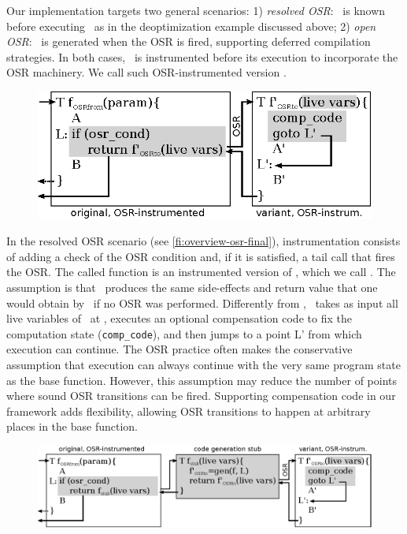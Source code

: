 Our implementation targets two general scenarios: 1) {\em resolved OSR}: \fvariant\ is known before executing \fbase\ as in the deoptimization example discussed above; 2) {\em open OSR}: \fvariant\ is generated when the OSR is fired, supporting deferred compilation strategies. In both cases, \fbase\ is instrumented before its execution to incorporate the OSR machinery. We call such OSR-instrumented version \fosrfrom.

\ifdefined\noauthorea
\begin{figure}[t]
\begin{center}
\includegraphics[width=0.7\columnwidth]{figures/overview-osr-final/overview-osr-final.eps}
\caption{\protect}
\end{center}
\end{figure}
\fi

In the resolved OSR scenario (see \myfigure\ref{fi:overview-osr-final}), instrumentation consists of adding a check of the OSR condition and, if it is satisfied, a tail call that fires the OSR. The called function is an instrumented version of \fvariant, which we call \fosrto. The assumption is that \fosrto\ produces the same side-effects and return value that one would obtain by \fbase\ if no OSR was performed. Differently from \fvariant, \fosrto\ takes as input all live variables of \fbase\ at \osrpoint, executes an optional compensation code to fix the computation state ({\tt comp\_code}), and then jumps to a point \textsf{L'} from which execution can continue. The OSR practice often makes the conservative assumption that execution can always continue with the very same program state as the base function. However, this assumption may reduce the number of points where sound OSR transitions can be fired. Supporting compensation code in our framework adds flexibility, allowing OSR transitions to happen at arbitrary places in the base function.

\ifdefined\noauthorea
\begin{figure}[h!]
\begin{center}
\includegraphics[width=1.0\columnwidth]{figures/overview-osr-open/overview-osr-open.eps}
\caption{\protect}
\end{center}
\end{figure}
\fi


